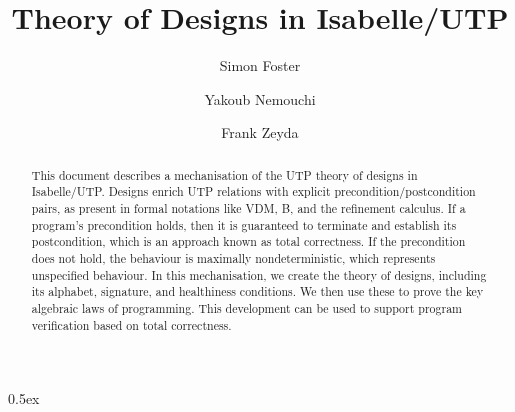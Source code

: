 \documentclass[11pt,a4paper]{article}
\begin{document}
\title{Theory of Designs in Isabelle/UTP}

\author{Simon Foster \and Yakoub Nemouchi \and Frank Zeyda}

\maketitle

\begin{abstract}
  This document describes a mechanisation of the UTP theory of designs in Isabelle/UTP. Designs enrich UTP relations
  with explicit precondition/postcondition pairs, as present in formal notations like VDM, B, and the refinement
  calculus. If a program's precondition holds, then it is guaranteed to terminate and establish its postcondition, which
  is an approach known as total correctness. If the precondition does not hold, the behaviour is maximally nondeterministic,
  which represents unspecified behaviour. In this mechanisation, we create the theory of designs, including its
  alphabet, signature, and healthiness conditions. We then use these to prove the key algebraic laws of
  programming. This development can be used to support program verification based on total correctness.
\end{abstract}

\tableofcontents

\parindent 0pt\parskip 0.5ex





\end{document}
